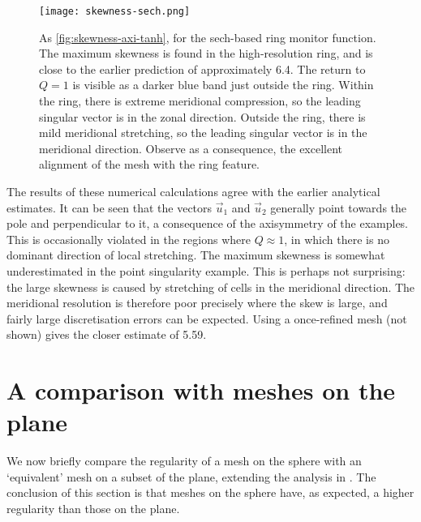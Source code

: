 \documentclass[11pt, a4paper]{scrartcl}  %
\theoremstyle{plain}
\theoremstyle{definition}
\numberwithin{equation}{section}
\begin{document}
\begin{figure}[!tb]
  \centering
  \texttt{[image: skewness-sech.png]}
  \caption{As \cref{fig:skewness-axi-tanh}, for the sech-based ring
monitor function. The maximum skewness is found in the high-resolution
ring, and is close to the earlier prediction of approximately 6.4. The
return to $Q = 1$ is visible as a darker blue band just outside the
ring. Within the ring, there is extreme meridional compression, so the
leading singular vector is in the zonal direction. Outside the ring,
there is mild meridional stretching, so the leading singular vector is
in the meridional direction. Observe as a consequence, the excellent
alignment of the mesh with the ring feature.}
\label{fig:skewness-axi-sech}
\end{figure}

The results of these numerical calculations agree with the earlier
analytical estimates. It can be seen that the vectors
$\vec{u}_1$ and $\vec{u}_2$ generally point towards the pole and
perpendicular to it, a consequence of the axisymmetry of the examples.
This is occasionally violated in the regions where $Q \approx 1$, in
which there is no dominant direction of local stretching. The maximum
skewness is somewhat underestimated in the point singularity example.
This is perhaps not surprising: the large skewness is caused by
stretching of cells in the meridional direction. The meridional
resolution is therefore poor precisely where the skew is large, and
fairly large discretisation errors can be expected. Using a once-refined
mesh (not shown) gives the closer estimate of 5.59.

\section{A comparison with meshes on the plane}
\label{sec:planecomp}

We now briefly compare the regularity of a mesh on the sphere with an
`equivalent' mesh on a subset of the plane, extending the analysis in
\citet{budd2015geometry}. The conclusion of this section is that meshes
on the sphere have, as expected, a higher regularity than those on the
plane.
\end{document}
